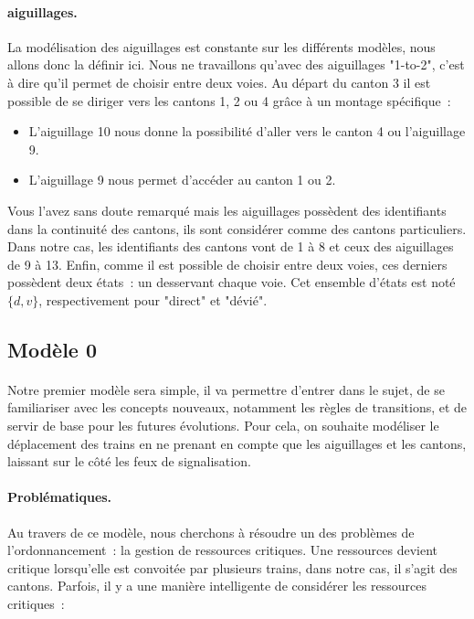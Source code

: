 \documentclass[oneside, a4paper, 11pt]{book}
\begin{document}
\paragraph{aiguillages.} 
La modélisation des aiguillages est constante sur les différents modèles, nous allons donc la définir ici. Nous ne travaillons qu'avec des aiguillages "1-to-2", c'est à dire qu'il permet de choisir entre deux voies.
Au départ du canton 3 il est possible de se diriger vers les cantons 1, 2 ou 4 grâce à un montage spécifique~: 
\begin{itemize}
	\item L'aiguillage 10 nous donne la possibilité d'aller vers le canton 4 ou l'aiguillage 9.
	\item L'aiguillage 9 nous permet d'accéder au canton 1 ou 2.
\end{itemize}
Vous l'avez sans doute remarqué mais les aiguillages possèdent des identifiants dans la continuité des cantons, ils sont considérer comme des cantons particuliers. Dans notre cas, les identifiants des cantons vont de 1 à 8 et ceux des aiguillages de 9 à 13.
Enfin, comme il est possible de choisir entre deux voies, ces derniers possèdent deux états~: un desservant chaque voie. Cet ensemble d'états est noté $\{d,v\}$, respectivement pour "direct" et "dévié". 

\subsection{Modèle 0}

\paragraph{} Notre premier modèle sera simple, il va permettre d'entrer dans le sujet, de se familiariser avec les concepts nouveaux, notamment les règles de transitions, et de servir de base pour les futures évolutions.
Pour cela, on souhaite modéliser le déplacement des trains en ne prenant en compte que les aiguillages et les cantons, laissant sur le côté les feux de signalisation.

\paragraph{Problématiques.} %
Au travers de ce modèle, nous cherchons à résoudre un des problèmes de l'ordonnancement~: la gestion de ressources critiques. 
Une ressources devient critique lorsqu'elle est convoitée par plusieurs trains, dans notre cas, il s'agit des cantons.
Parfois, il y a une manière intelligente de considérer les ressources critiques~:
\end{document}
